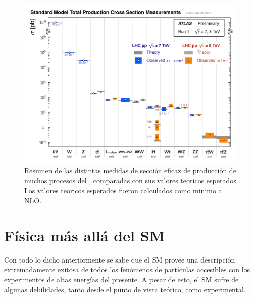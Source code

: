 \begin{figure}[!htbp]
  \centering
  \includegraphics[width=1\textwidth]{figures/ATLAS_a_SMSummary_TotalXsect.pdf}
  \caption{Resumen de las distintas medidas de secci\'on eficaz de producci\'on de muchos
    procesos del {\SM}, comparadas con sus valores teoricos esperados.
    Los valores teoricos esperados fueron calculados como minimo a NLO.
  }\label{fig:sm_atlas_xs}
\end{figure}


\section{Física más allá del SM}

Con todo lo dicho anteriormente se sabe que el SM provee una descripción
extremadamente exitosa de todos los fenómenos de partículas accesibles con los
experimentos de altas energías del presente. A pesar de esto, el SM sufre de
algunas debilidades, tanto desde el punto de vista teórico, como experimental.

